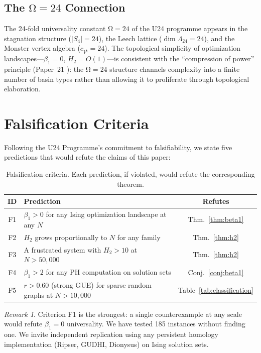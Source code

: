 \documentclass[12pt,a4paper]{article}
\theoremstyle{definition}\newtheorem{definition}[theorem]{Definition}
\theoremstyle{remark}\newtheorem{remark}[theorem]{Remark}
\renewcommand{\O}{\mathrm{\Omega}}
\newcommand{\Leech}{\Lambda_{24}}
\newcommand{\Htwo}{H_2}
\newcommand{\betaone}{\beta_1}
\begin{document}
\subsection{The $\O = 24$ Connection}

The 24-fold universality constant $\O = 24$ of the U24 programme appears
in the stagnation structure ($|S_4| = 24$), the Leech lattice
($\dim \Leech = 24$), and the Monster vertex algebra
($c_{V^\natural} = 24$). The topological simplicity of optimization
landscapes---$\betaone = 0$, $\Htwo = O(1)$---is consistent with the
``compression of power'' principle (Paper~21 \cite{paper21}): the
$\O = 24$ structure channels complexity into a finite number of basin
types rather than allowing it to proliferate through topological
elaboration.


\section{Falsification Criteria}
\label{sec:falsification}

Following the U24 Programme's commitment to falsifiability, we state five
predictions that would refute the claims of this paper:

\begin{table}[H]
\centering
\caption{Falsification criteria. Each prediction, if violated, would refute the
corresponding theorem.}
\label{tab:falsification}
\begin{tabular}{@{}clc@{}}
\toprule
\textbf{ID} & \textbf{Prediction} & \textbf{Refutes} \\
\midrule
F1 & $\betaone > 0$ for any Ising optimization landscape at any $N$ & Thm.~\ref{thm:beta1} \\
F2 & $\Htwo$ grows proportionally to $N$ for any family & Thm.~\ref{thm:h2} \\
F3 & A frustrated system with $\Htwo > 10$ at $N > 50{,}000$ & Thm.~\ref{thm:h2} \\
F4 & $\betaone > 2$ for any PH computation on solution sets & Conj.~\ref{conj:beta1} \\
F5 & $r > 0.60$ (strong GUE) for sparse random graphs at $N > 10{,}000$ & Table~\ref{tab:classification} \\
\bottomrule
\end{tabular}
\end{table}

\begin{remark}
Criterion F1 is the strongest: a single counterexample at any scale would
refute $\betaone = 0$ universality. We have tested 185 instances without
finding one. We invite independent replication using any persistent homology
implementation (Ripser, GUDHI, Dionysus) on Ising solution sets.
\end{remark}
\end{document}
